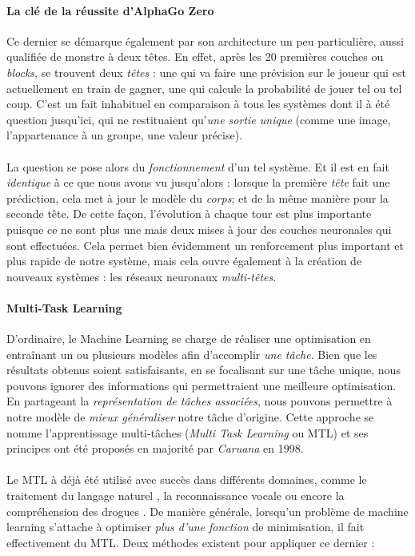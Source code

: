 \paragraph{La clé de la réussite d'AlphaGo Zero} Ce dernier se démarque également par son architecture un peu particulière,
aussi qualifiée de \guillemotleft monstre à deux têtes\guillemotright. \cite{AlphaGo3} En effet, après les 20 premières
couches ou \emph{blocks}, se trouvent deux \emph{têtes} : une qui va faire une prévision sur le joueur qui est actuellement
en train de gagner, une qui calcule la probabilité de jouer tel ou tel coup. C'est un fait inhabituel en comparaison à tous
les systèmes dont il à été question jusqu'ici, qui ne restituaient qu'\emph{une sortie unique} (comme une image, l'appartenance
à un groupe, une valeur précise).

\paragraph{} La question se pose alors du \emph{fonctionnement} d'un tel système. Et il est en fait \emph{identique}
à ce que nous avons vu jusqu'alors : lorsque la première \emph{tête} fait une prédiction, cela met à jour le modèle
du \emph{corps}; et de la même manière pour la seconde tête. De cette façon, l'évolution à chaque tour est plus importante
puisque ce ne sont plus une mais deux mises à jour des couches neuronales qui sont effectuées. Cela permet bien évidemment
un renforcement plus important et plus rapide de notre système, mais cela ouvre également à la création de nouveaux systèmes :
les réseaux neuronaux \emph{multi-têtes}.

\paragraph{Multi-Task Learning} D'ordinaire, le Machine Learning se charge de réaliser une optimisation
en entraînant un ou plusieurs modèles afin d'accomplir \emph{une tâche}. Bien que les résultats obtenus soient satisfaisants, en se 
focalisant sur une tâche unique, nous pouvons ignorer des informations qui permettraient une meilleure optimisation. En partageant la 
\emph{représentation de tâches associées}, nous pouvons permettre à notre modèle de \emph{mieux généraliser} notre tâche d'origine.
Cette approche se nomme l'apprentissage multi-tâches (\emph{Multi Task Learning} ou MTL) et ses principes ont été proposés en majorité 
par \emph{Caruana} en 1998. \cite{NeuralNets1}

\paragraph{} Le MTL à déjà été utilisé avec succès dans différents domaines, comme le traitement du langage naturel \cite{MultiLearning0},
la reconnaissance vocale \cite{MultiLearning1} ou encore la compréhension des drogues \cite{MultiLearning2}. De manière générale, lorsqu'un
problème de machine learning s'attache à optimiser \emph{plus d'une fonction} de minimisation, il fait effectivement du MTL. Deux méthodes 
existent pour appliquer ce dernier :


